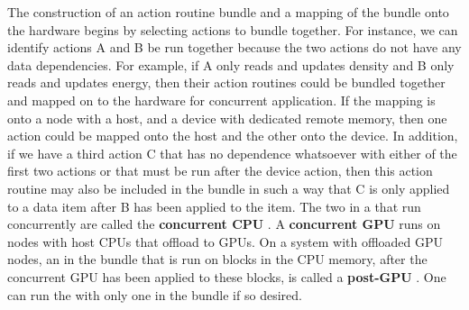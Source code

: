 \documentclass{article}
\begin{document}
The construction of an action routine bundle and a mapping of the bundle onto the
hardware begins by selecting actions to bundle
together.  For instance, we can identify actions A and B be
run together because the two actions do not have any data
dependencies.  For example, if A only reads and updates density and
B only reads and updates energy, then their action routines could be bundled together
and mapped on to the hardware for concurrent application.  If the mapping is onto a node with a host,
and a device with dedicated remote memory, then one action could be mapped onto
the host and the other onto the device.  In
addition, if we have a third action C that has no dependence whatsoever with either
of the first two actions or that must be run after the device action, then this
action routine may also be included in the bundle in such a way that C is only
applied to a data item after B has been applied to the item.
The two \actionroutines in a \actionroutinebundle that run concurrently
are called the \textbf{concurrent CPU \actionroutine}. A \textbf{concurrent GPU \actionroutine}
runs on nodes with host CPUs that offload to GPUs.  On a system with offloaded GPU nodes, an
\actionroutine in the bundle that is run on blocks in the CPU memory, after the concurrent
GPU \actionroutine has been applied to these blocks, is called a \textbf{post-GPU
\actionroutine}.  One can run the \OR with only one \actionroutine in the bundle
if so desired.\\
\end{document}
